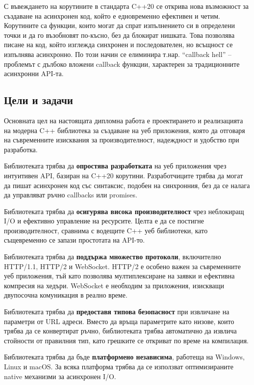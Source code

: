 С въвеждането на корутините в стандарта C++20 \cite{cpp20standard} се открива нова възможност за създаване на асинхронен код, който е едновременно ефективен и четим. Корутините са функции, които могат да спрат изпълнението си в определени точки и да го възобновят по-късно, без да блокират нишката. Това позволява писане на код, който изглежда синхронен и последователен, но всъщност се изпълнява асинхронно. По този начин се елиминира т.нар. ``callback hell'' -- проблемът с дълбоко вложени callback функции, характерен за традиционните асинхронни API-та.

\subsection{Цели и задачи}

Основната цел на настоящата дипломна работа е проектирането и реализацията на модерна C++ библиотека за създаване на уеб приложения, която да отговаря на съвременните изисквания за производителност, надеждност и удобство при разработка.

Библиотеката трябва да \textbf{опростява разработката} на уеб приложения чрез интуитивен API, базиран на C++20 корутини. Разработчиците трябва да могат да пишат асинхронен код със синтаксис, подобен на синхронния, без да се налага да управляват ръчно callbacks или promises.

Библиотеката трябва да \textbf{осигурява висока производителност} чрез неблокиращ I/O и ефективно управление на ресурсите. Целта е да се постигне производителност, сравнима с водещите C++ уеб библиотеки, като същевременно се запази простотата на API-то.

Библиотеката трябва да \textbf{поддържа множество протоколи}, включително HTTP/1.1, HTTP/2 и WebSocket. HTTP/2 е особено важен за съвременните уеб приложения, тъй като позволява мултиплексиране на заявки и ефективна компресия на хедъри. WebSocket е необходим за приложения, изискващи двупосочна комуникация в реално време.

Библиотеката трябва да \textbf{предоставя типова безопасност} при извличане на параметри от URL адреси. Вместо да връща параметрите като низове, които трябва да се конвертират ръчно, библиотеката трябва автоматично да извлича стойности от правилния тип, като грешките се откриват по време на компилация.

Библиотеката трябва да бъде \textbf{платформено независима}, работеща на Windows, Linux и macOS. За всяка платформа трябва да се използват оптимизираните native механизми за асинхронен I/O.

